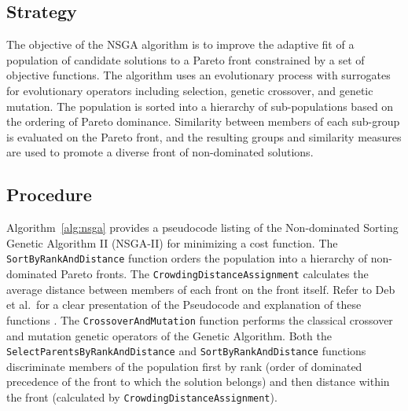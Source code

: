 \subsection{Strategy}
The objective of the NSGA algorithm is to improve the adaptive fit of a population of candidate solutions to a Pareto front constrained by a set of objective functions.
The algorithm uses an evolutionary process with surrogates for evolutionary operators including selection, genetic crossover, and genetic mutation. 
The population is sorted into a hierarchy of sub-populations based on the ordering of Pareto dominance. Similarity between members of each sub-group is evaluated on the Pareto front, and the resulting groups and similarity measures are used to promote a diverse front of non-dominated solutions.

\subsection{Procedure}
Algorithm~\ref{alg:nsga} provides a pseudocode listing of the Non-dominated Sorting Genetic Algorithm II (NSGA-II) for minimizing a cost function. 
The \texttt{Sort\-By\-Rank\-And\-Distance} function orders the population into a hierarchy of non-dominated Pareto fronts. The \texttt{Crowding\-Distance\-Assignment} calculates the average distance between members of each front on the front itself. Refer to Deb et al.\ for a clear presentation of the Pseudocode and explanation of these functions \cite{Deb2002}. The \texttt{Crossover\-And\-Mutation} function performs the classical crossover and mutation genetic operators of the Genetic Algorithm. Both the \texttt{Select\-Parents\-By\-Rank\-And\-Distance} and \texttt{Sort\-By\-Rank\-And\-Distance} functions discriminate members of the population first by rank (order of dominated precedence of the front to which the solution belongs) and then distance within the front (calculated by \texttt{Crowding\-Distance\-Assignment}).

